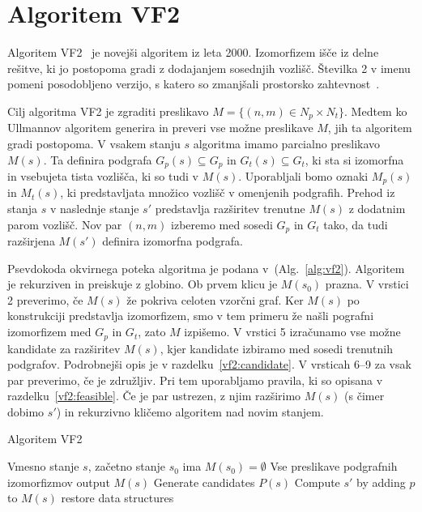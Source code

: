 \documentclass[a4paper, 12pt, ]{book}
\newcommand{\refalg}[1]{(Alg.~\ref{#1})}
\begin{document}
\chapter{Algoritem VF2}
	
	Algoritem VF2~\cite{vf2, vf2_2} je novejši algoritem iz leta 2000. Izomorfizem išče iz delne rešitve, ki jo postopoma gradi z dodajanjem sosednjih vozlišč.
	Številka 2 v imenu pomeni posodobljeno verzijo, s katero so zmanjšali prostorsko zahtevnost~\cite{vf2_3}.

	Cilj algoritma VF2 je zgraditi preslikavo $M = \{(n,m) \in N_p \times N_t\}$. Medtem ko Ullmannov algoritem generira in preveri vse možne preslikave
	$M$, jih ta algoritem gradi postopoma. V vsakem stanju $s$ algoritma imamo parcialno preslikavo $M(s)$. Ta definira podgrafa $G_p(s) \subseteq G_p$ 
	in $G_t(s) \subseteq G_t$, ki sta si izomorfna in vsebujeta tista vozlišča, ki so tudi v $M(s)$. Uporabljali bomo oznaki $M_p(s)$ in $M_t(s)$,
	ki predstavljata množico vozlišč v omenjenih podgrafih.	Prehod iz stanja $s$ v naslednje stanje $s'$ predstavlja razširitev trenutne $M(s)$ z dodatnim
	parom vozlišč. Nov par $(n, m)$ izberemo med sosedi $G_p$ in $G_t$ tako, da tudi razširjena $M(s')$ definira izomorfna podgrafa.
	
	Psevdokoda okvirnega poteka algoritma je podana v~\refalg{alg:vf2}. Algoritem je rekurziven in preiskuje z globino. Ob prvem klicu je $M(s_0)$ prazna.
	V vrstici 2 preverimo,
	če $M(s)$ že pokriva celoten vzorčni graf. Ker $M(s)$ po konstrukciji predstavlja izomorfizem, smo v tem primeru že našli pografni izomorfizem med
	$G_p$ in $G_t$, zato $M$ izpišemo. V vrstici 5 izračunamo vse možne kandidate za razširitev $M(s)$, kjer kandidate izbiramo med sosedi trenutnih
	podgrafov. Podrobnejši opis je v razdelku~\ref{vf2:candidate}. V vrsticah 6--9 za vsak par preverimo, če je združljiv. Pri tem uporabljamo pravila, ki so
	opisana v razdelku~\ref{vf2:feasible}. Če je par ustrezen, z njim razširimo $M(s)$ (s čimer dobimo $s'$) in rekurzivno kličemo algoritem nad novim
	stanjem.

\begin{algorithm}
\caption{Algoritem VF2}
\label{alg:vf2}
\begin{algorithmic}[1]
	\Require Vmesno stanje $s$, začetno stanje $s_0$ ima $M(s_0) = \emptyset $
	\Ensure Vse preslikave podgrafnih izomorfizmov
			\State output $M(s)$
		\Else
			\State Generate candidates $P(s)$
					\State Compute $s'$ by adding $p$ to $M(s)$
					\State {}
				\EndIf
			\EndFor
		\EndIf
		\State restore data structures
	\EndProcedure
\end{algorithmic}
\end{algorithm}
\end{document}
